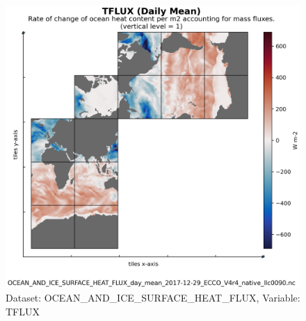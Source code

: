 \begin{figure}[H]
\centering
\includegraphics[scale=0.55]{../images/plots/native_plots/Ocean_and_Sea-Ice_Surface_Heat_Fluxes/TFLUX.png}
\caption{Dataset: OCEAN\_AND\_ICE\_SURFACE\_HEAT\_FLUX, Variable: TFLUX}
\label{tab:table-OCEAN_AND_ICE_SURFACE_HEAT_FLUX_TFLUX-Plot}
\end{figure}
\newpage
\pagebreak
